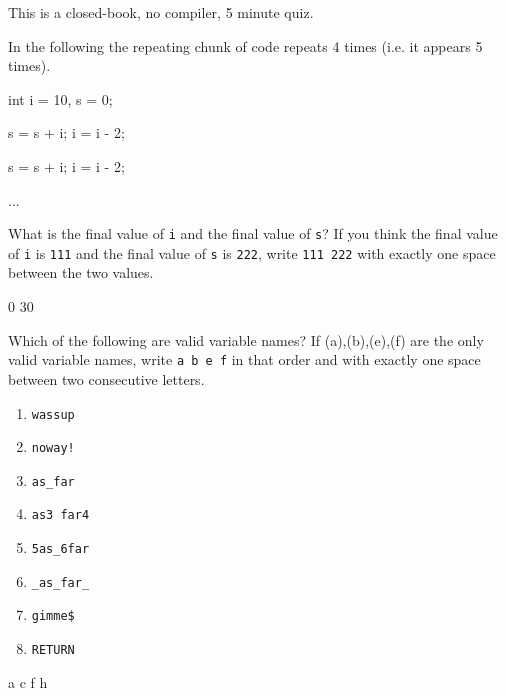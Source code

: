 

This is a closed-book, no compiler, 5 minute quiz.

\nextq
In the following
the repeating chunk of code repeats 4 times (i.e. it appears 5 times).
{\small
\begin{console}[commandchars=\@\{\}]
int i = 10, s = 0;

s = s + i;
i = i - 2;

s = s + i;
i = i - 2;

...
\end{console}
What is the final value of \verb!i! and the final value of \verb!s!?
If you think the final value of \verb!i! is \verb!111!
and the final value of \verb!s! is \verb!222!, write \verb!111 222!
with exactly one space between the two values.
\\
\ANSWER
\begin{answercode}
0 30
\end{answercode}

\nextq
Which of the following are valid variable names?
If (a),(b),(e),(f) are the only valid variable names, write \verb!a b e f!
in that order and with exactly one space between two consecutive letters.
\begin{enumerate}[nosep,label=(\alph*)]
\item  \hspace{0.5cm}\texttt{wassup}
\item  \hspace{0.5cm}\texttt{noway!}
\item  \hspace{0.5cm}\texttt{as\_far}
\item  \hspace{0.5cm}\texttt{as3 far4}
\item  \hspace{0.5cm}\texttt{5as\_6far}
\item  \hspace{0.5cm}\texttt{\_as\_far\_}
\item  \hspace{0.5cm}\texttt{gimme\$}
\item  \hspace{0.5cm}\texttt{RETURN}
\end{enumerate}
\ANSWER
\begin{answercode}
a c f h
\end{answercode}

}
